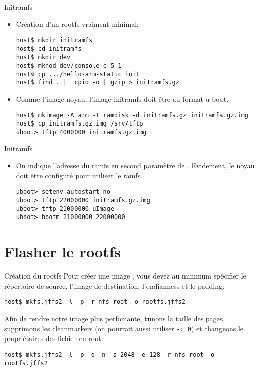 \begin{frame}[fragile=singleslide]{Initramfs}
  \begin{itemize} 
  \item Création d'un rootfs vraiment minimal:
    \begin{lstlisting}
host$ mkdir initramfs
host$ cd initramfs
host$ mkdir dev
host$ mknod dev/console c 5 1
host% cp .../hello-arm-static init
host$ find . |  cpio -o | gzip > initramfs.gz
    \end{lstlisting}
  \item Comme l'image noyau, l'image initramfs doit être au format u-boot.
    \begin{lstlisting} 
host$ mkimage -A arm -T ramdisk -d initramfs.gz initramfs.gz.img
host$ cp initramfs.gz.img /srv/tftp
uboot> tftp 4000000 initramfs.gz.img
    \end{lstlisting}
  \end{itemize}
\end{frame}

\begin{frame}[fragile=singleslide]{Initramfs}
  \begin{itemize} 
  \item  On  indique  l'adresse   du  ramfs  en  second  paramètre  de
    . Evidement, le noyau doit être configuré pour utiliser
    le ramfs.
    \begin{lstlisting} 
uboot> setenv autostart no
uboot> tftp 22000000 initramfs.gz.img 
uboot> tftp 21000000 uImage 
uboot> bootm 21000000 22000000 
    \end{lstlisting}
  \end{itemize}
\end{frame}

\section{Flasher le rootfs}

\begin{frame}[fragile=singleslide]{Création du rootfs}
  Pour créer une image , vous devez au minimum spécifier le
  répertoire  de source,  l'image de  destination, l'endianness  et le
  padding:
  \begin{lstlisting} 
host$ mkfs.jffs2 -l -p -r nfs-root -o rootfs.jffs2
  \end{lstlisting}
  Afin de  rendre notre  image plus perfomante,  tunons la  taille des
  pages,  supprimons  les  cleanmarkers  (on pourrait  aussi  utiliser
  \verb+-c 0+) et changeons le propriétaires des fichier en root:
  \begin{lstlisting} 
host$ mkfs.jffs2 -l -p -q -n -s 2048 -e 128 -r nfs-root -o rootfs.jffs2
  \end{lstlisting}
\end{frame}

